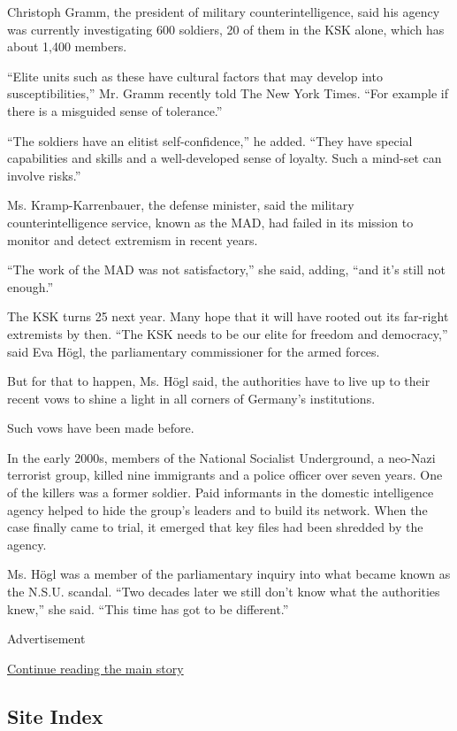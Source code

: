 Christoph Gramm, the president of military counterintelligence, said his
agency was currently investigating 600 soldiers, 20 of them in the KSK
alone, which has about 1,400 members.

``Elite units such as these have cultural factors that may develop into
susceptibilities,'' Mr. Gramm recently told The New York Times. ``For
example if there is a misguided sense of tolerance.''

``The soldiers have an elitist self-confidence,'' he added. ``They have
special capabilities and skills and a well-developed sense of loyalty.
Such a mind-set can involve risks.''

Ms. Kramp-Karrenbauer, the defense minister, said the military
counterintelligence service, known as the MAD, had failed in its mission
to monitor and detect extremism in recent years.

``The work of the MAD was not satisfactory,'' she said, adding, ``and
it's still not enough.''

The KSK turns 25 next year. Many hope that it will have rooted out its
far-right extremists by then. ``The KSK needs to be our elite for
freedom and democracy,'' said Eva Högl, the parliamentary commissioner
for the armed forces.

But for that to happen, Ms. Högl said, the authorities have to live up
to their recent vows to shine a light in all corners of Germany's
institutions.

Such vows have been made before.

In the early 2000s, members of the National Socialist Underground, a
neo-Nazi terrorist group, killed nine immigrants and a police officer
over seven years. One of the killers was a former soldier. Paid
informants in the domestic intelligence agency helped to hide the
group's leaders and to build its network. When the case finally came to
trial, it emerged that key files had been shredded by the agency.

Ms. Högl was a member of the parliamentary inquiry into what became
known as the N.S.U. scandal. ``Two decades later we still don't know
what the authorities knew,'' she said. ``This time has got to be
different.''

Advertisement

\protect\hyperlink{after-bottom}{Continue reading the main story}

\hypertarget{site-index}{%
\subsection{Site Index}\label{site-index}}

